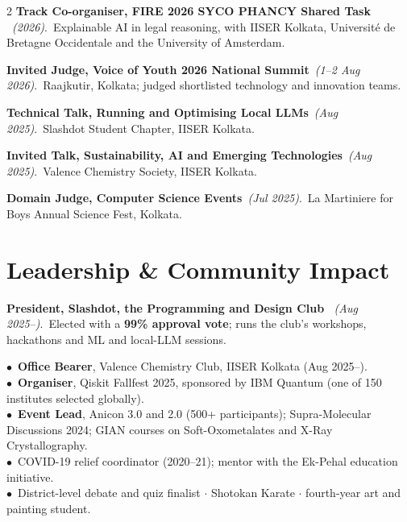\documentclass[a4paper,10.5pt]{extarticle}
\newcommand{\proj}[3]{{\small\textbf{#1}~{\itshape\textcolor{mutedtext}{(#2)}}.\ #3}\par\vspace{2.8pt}}
\begin{document}
\begin{paracol}{2}
\proj{Track Co-organiser, FIRE 2026 SYCO PHANCY Shared Task \href{https://sycolex.com/}{\faGlobe}}{2026}{Explainable AI in legal reasoning, with IISER Kolkata, Universit\'e de Bretagne Occidentale and the University of Amsterdam.}

\proj{Invited Judge, Voice of Youth 2026 National Summit}{1--2 Aug 2026}{Raajkutir, Kolkata; judged shortlisted technology and innovation teams.}

\proj{Technical Talk, Running and Optimising Local LLMs}{Aug 2025}{Slashdot Student Chapter, IISER Kolkata.}

\proj{Invited Talk, Sustainability, AI and Emerging Technologies}{Aug 2025}{Valence Chemistry Society, IISER Kolkata.}

\proj{Domain Judge, Computer Science Events}{Jul 2025}{La Martiniere for Boys Annual Science Fest, Kolkata.}

\section{Leadership \& Community Impact}

\proj{President, Slashdot, the Programming and Design Club \href{https://slashdot-iiserk.github.io/}{\faGlobe}}{Aug 2025--}{Elected with a \textbf{99\% approval vote}; runs the club's workshops, hackathons and ML and local-LLM sessions.}

{\small
$\bullet$~\textbf{Office Bearer}, Valence Chemistry Club, IISER Kolkata (Aug 2025--).\\
$\bullet$~\textbf{Organiser}, Qiskit Fallfest 2025, sponsored by IBM Quantum (one of 150 institutes selected globally).\\
$\bullet$~\textbf{Event Lead}, Anicon 3.0 and 2.0 (500+ participants); Supra-Molecular Discussions 2024; GIAN courses on Soft-Oxometalates and X-Ray Crystallography.\\
$\bullet$~COVID-19 relief coordinator (2020--21); mentor with the Ek-Pehal education initiative.\\
$\bullet$~District-level debate and quiz finalist $\cdot$ Shotokan Karate $\cdot$ fourth-year art and painting student.
}

\end{paracol}
\end{document}
